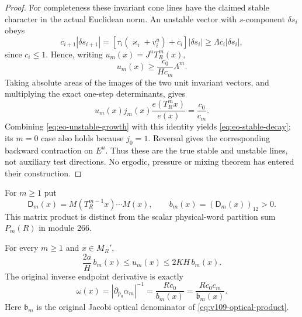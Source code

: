 \begin{proof}
For completeness these invariant cone lines have the claimed
stable character in the actual Euclidean norm.  An unstable
vector with $s$-component $\delta s_i$ obeys
\[
 c_{i+1}|\delta s_{i+1}|
  =[\tau_i(\varkappa_i+v_i^u)+c_i]|\delta s_i|
  \ge\Lambda c_i|\delta s_i|,
\]
since $c_i\le1$.  Hence, writing
$u_m(x)=J^uT_R^m(x)$,
\begin{equation}\label{eq:eo-unstable-growth}
               u_m(x)\ge
                 \frac{c_0}{Hc_m}\Lambda^m.
\end{equation}
Taking absolute areas of the images of the two unit invariant
vectors, and multiplying the exact one-step determinants, gives
\begin{equation}\label{eq:eo-area-cocycle}
        u_m(x)j_m(x)\frac{e(T_R^mx)}{e(x)}
                         =\frac{c_0}{c_m}.
\end{equation}
Combining \eqref{eq:eo-unstable-growth} with this identity yields
\eqref{eq:eo-stable-decay}; its $m=0$ case also holds because
$j_0=1$.  Reversal gives the corresponding backward contraction
on $E^u$.  Thus these are the true stable and unstable lines, not
auxiliary test directions.  No ergodic, pressure or mixing theorem
has entered their construction.
\end{proof}

For $m\ge1$ put
\[
       \mathsf D_m(x)=M(T_R^{m-1}x)\cdots M(x),\qquad
       b_m(x)=(\mathsf D_m(x))_{12}>0.
\]
This matrix product is distinct from the scalar physical-word
partition sum $P_m(R)$ in module 266.

\begin{lemma}
\label{lem:eo-columns}
For every $m\ge1$ and $x\in M_R'$,
\begin{equation}\label{eq:eo-column-bound}
       \frac{2a}{H}\,b_m(x)\le u_m(x)
                               \le2KH\,b_m(x).
\end{equation}
The original inverse endpoint derivative is exactly
\begin{equation}\label{eq:eo-original-omega}
 \omega(x)=|\partial_{p_0}\alpha_m|^{-1}
                   =\frac{Rc_0}{b_m(x)}
                   =\frac{Rc_0c_m}{\mathfrak b_m(x)}.
\end{equation}
Here $\mathfrak b_m$ is the original Jacobi optical denominator
of \eqref{eq:v109-optical-product}.
\end{lemma}


